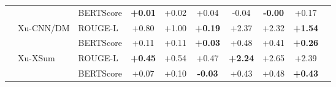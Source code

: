 \begin{table}[!tp]
\begin{tabular}{lllccccccc}
 &  & BERTScore & \textbf{+0.01} & +0.02 & +0.04 & -0.04 & \textbf{-0.00} & +0.17 \\
\cmidrule(lr){2-9}
 & \multirow{2}{*}{Xu-CNN/DM} & ROUGE-L & +0.80 & +1.00 & \textbf{+0.19} & +2.37 & +2.32 & \textbf{+1.54} \\
 &  & BERTScore & +0.11 & +0.11 & \textbf{+0.03} & +0.48 & +0.41 & \textbf{+0.26} \\
\cmidrule(lr){2-9}
 & \multirow{2}{*}{Xu-XSum} & ROUGE-L & \textbf{+0.45} & +0.54 & +0.47 & \textbf{+2.24} & +2.65 & +2.39 \\
 &  & BERTScore & +0.07 & +0.10 & \textbf{-0.03} & +0.43 & +0.48 & \textbf{+0.43} \\
\bottomrule
\end{tabular}
\end{table}
